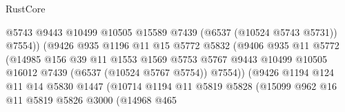 \begin{lexlean}{RustCore}
\begin{coremodule}
                                        @5743
                                        @9443
                                        @10499
                                        @10505
                                        @15589
                                        @7439
                                        (@6537 (@10524 @5743 @5731))
                                        @7554))
                                    (@9426
                                      @935
                                      @1196
                                      @11
                                      @15
                                      @5772
                                      @5832
                                      (@9406
                                        @935
                                        @11
                                        @5772
                                        (@14985
                                          @156
                                          @39
                                          @11
                                          @1553
                                          @1569
                                          @5753
                                          @5767
                                          @9443
                                          @10499
                                          @10505
                                          @16012
                                          @7439
                                          (@6537 (@10524 @5767 @5754))
                                          @7554))
                                      (@9426
                                        @1194
                                        @124
                                        @11
                                        @14
                                        @5830
                                        @1447
                                        (@10714
                                          @1194
                                          @11
                                          @5819
                                          @5828
                                          (@15099
                                            @962
                                            @16
                                            @11
                                            @5819
                                            @5826
                                            @3000
                                            (@14968
                                              @465

\end{coremodule}
\end{lexlean}
